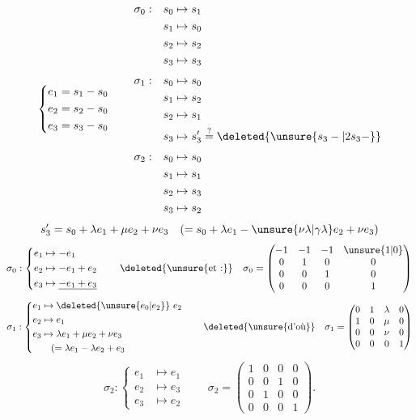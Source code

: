 \[
\left\{\begin{aligned}e_1&=s_1-s_0\\e_2&=s_2-s_0\\e_3&=s_3-s_0\end{aligned}\right.
\qquad
\begin{aligned}
\sigma_0:\quad&s_0\mapsto s_1\\&s_1\mapsto s_0\\&s_2\mapsto s_2\\&s_3\mapsto s_3\\[3pt]
\sigma_1:\quad&s_0\mapsto s_0\\&s_1\mapsto s_2\\&s_2\mapsto s_1\\&s_3\mapsto s'_3\overset{?}{=}\deleted{\unsure{s_3-|2s_3-}}\\[3pt]
\sigma_2:\quad&s_0\mapsto s_0\\&s_1\mapsto s_1\\&s_2\mapsto s_3\\&s_3\mapsto s_2
\end{aligned}
\]
\[
s'_3=s_0+\lambda e_1+\mu e_2+\nu e_3
\quad(=s_0+\lambda e_1-\unsure{\nu\lambda|\gamma\lambda}e_2+\nu e_3)
\]
\[
\sigma_0:\left\{\begin{aligned}e_1&\mapsto-e_1\\e_2&\mapsto-e_1+e_2\\e_3&\mapsto\underline{-e_1+e_3}\end{aligned}\right.
\qquad
\deleted{\unsure{\text{et :}}}\quad
\sigma_0=\begin{pmatrix}-1&-1&-1&\unsure{1|0}\\0&1&0&0\\0&0&1&0\\0&0&0&1\end{pmatrix}
\]
\[
\sigma_1:\left\{\begin{aligned}e_1&\mapsto\deleted{\unsure{e_0|e_2}}\ e_2\\e_2&\mapsto e_1\\e_3&\mapsto\lambda e_1+\mu e_2+\nu e_3\\&\quad(=\lambda e_1-\lambda e_2+e_3\end{aligned}\right.
\qquad
\deleted{\unsure{\text{d'où}}}\quad
\sigma_1=\begin{pmatrix}0&1&\lambda&0\\1&0&\mu&0\\0&0&\nu&0\\0&0&0&1\end{pmatrix}
\]
\[
\sigma_2:\left\{\begin{aligned}e_1&\mapsto e_1\\e_2&\mapsto e_3\\e_3&\mapsto e_2\end{aligned}\right.
\qquad
\sigma_2=\begin{pmatrix}1&0&0&0\\0&0&1&0\\0&1&0&0\\0&0&0&1\end{pmatrix}.
\]
